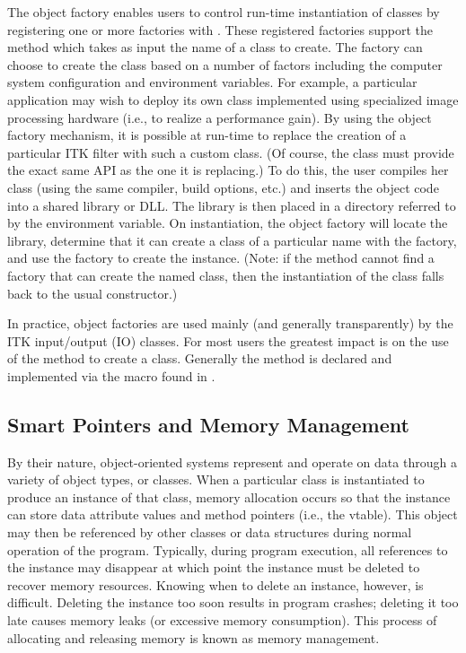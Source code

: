 The object factory enables users to control run-time instantiation of classes
by registering one or more factories with . These
registered factories support the method 
which takes as input the name of a class to create. The factory can choose to
create the class based on a number of factors including the computer system
configuration and environment variables. For example, a particular
application may wish to deploy its own class implemented using
specialized image processing hardware (i.e., to realize a performance
gain). By using the object factory mechanism, it is possible at run-time to
replace the creation of a particular ITK filter with such a custom class. (Of
course, the class must provide the exact same API as the one it is
replacing.) To do this, the user compiles her class (using the same compiler,
build options, etc.) and inserts the object code into a shared library or
DLL. The library is then placed in a directory referred to by the
 environment variable. On instantiation, the object
factory will locate the library, determine that it can create a class of a
particular name with the factory, and use the factory to create the
instance. (Note: if the  method cannot find a factory
that can create the named class, then the instantiation of the class falls
back to the usual constructor.)

In practice, object factories are used mainly (and generally transparently) by
the ITK input/output (IO) classes. For most users the greatest impact is on
the use of the  method to create a class. Generally the
 method is declared and implemented via the macro
 found in .


\subsection{Smart Pointers and Memory Management}
\label{sec:SmartPointers}


By their nature, object-oriented systems represent and operate on data through
a variety of object types, or classes. When a particular class is
instantiated to produce an instance of that class, memory allocation occurs
so that the instance can store data attribute values and method pointers
(i.e., the vtable). This object may then be referenced by other classes or
data structures during normal operation of the program. Typically, during
program execution, all references to the instance may disappear at which point
the instance must be deleted to recover memory resources. Knowing when to
delete an instance, however, is difficult. Deleting the instance too soon
results in program crashes; deleting it too late causes memory leaks (or
excessive memory consumption). This process of allocating and
releasing memory is known as memory management.

